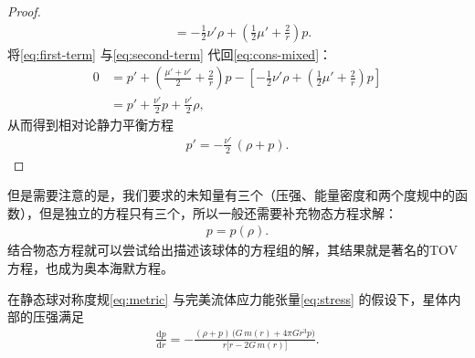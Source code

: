 \begin{proof}
\begin{align}
&=-\tfrac{1}{2}\nu'\rho+\left(\tfrac{1}{2}\mu'+\frac{2}{r}\right)p.\nonumber
\end{align}
将\eqref{eq:first-term} 与\eqref{eq:second-term} 代回\eqref{eq:cons-mixed}：
\begin{align}
0&=p'+\left(\frac{\mu'+\nu'}{2}+\frac{2}{r}\right)p
-\left[-\tfrac{1}{2}\nu'\rho+\left(\tfrac{1}{2}\mu'+\frac{2}{r}\right)p\right]\nonumber\\
&=p'+\frac{\nu'}{2}p+\frac{\nu'}{2}\rho,\label{eq:hydro-step}
\end{align}
从而得到相对论静力平衡方程
\begin{align}
p'=-\frac{\nu'}{2}\,(\rho+p).\label{eq:hydro-final}
\end{align}
\end{proof}
但是需要注意的是，我们要求的未知量有三个（压强、能量密度和两个度规中的函数），但是独立的方程只有三个，所以一般还需要补充物态方程求解：
\begin{align}
p=p(\rho).\label{eq:eos}
\end{align}
结合物态方程就可以尝试给出描述该球体的方程组的解，其结果就是著名的TOV方程，也成为奥本海默方程。
\begin{theorem}\label{thm:TOV}
在静态球对称度规\eqref{eq:metric} 与完美流体应力能张量\eqref{eq:stress} 的假设下，星体内部的压强满足
\begin{align}
\frac{\mathrm{d}p}{\mathrm{d}r}
=-\frac{(\rho+p)\,\bigl(G\,m(r)+4\pi G r^{3}p\bigr)}{r\bigl[r-2G\,m(r)\bigr]}.\label{eq:TOV}
\end{align}
\end{theorem}

